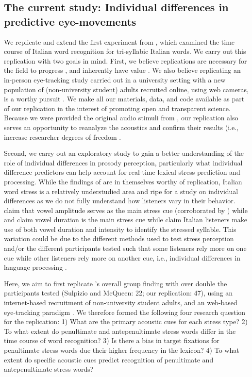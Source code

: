 \subsection{The current study: Individual differences in predictive eye-movements}

We replicate and extend the first experiment from \cite{Sulpizio_McQueen_2012}, which examined the time course of Italian word recognition for tri-syllabic Italian words. We carry out this replication with two goals in mind. First, we believe replications are necessary for the field to progress \citep{Rakosi2017}, and inherently have value \citep{Kobrock2023}. We also believe replicating an in-person eye-tracking study carried out in a university setting with a new population of (non-university student) adults recruited online, using web cameras, is a worthy pursuit \citep{Prystauka_Altmann_Rothman_2023}. We make all our materials, data, and code available as part of our replication in the interest of promoting open and transparent science. Because we were provided the original audio stimuli from \cite{Sulpizio_McQueen_2012}, our replication also serves an opportunity to reanalyze the acoustics and confirm their results (i.e., increase researcher degrees of freedom \cite{Corretta2023}.

Second, we carry out an exploratory study to gain a better understanding of the role of individual differences in prosody perception, particularly what individual difference predictors can help account for real-time lexical stress prediction and processing. While the findings of \cite{Sulpizio_McQueen_2012} are in themselves worthy of replication, Italian word stress is a relatively understudied area and ripe for a study on individual differences as we do not fully understand how listeners vary in their behavior.  \cite{Maturi1998} claim that vowel amplitude serves as the main stress cue (corroborated by \cite{Sulpizio_McQueen_2012}) while \cite{Alfano2006} and \cite{Alfano2009} claim vowel duration is the main stress cue while \cite{Tagliapietra2005} claim Italian listeners make use of both vowel duration and intensity to identify the stressed syllable. This variation could be due to the different methods used to test stress perception and/or the different participants tested such that some listeners rely more on one cue while other listeners rely more on another cue, i.e., individual differences in language processing \citep{Yu2019,Kidd2018}.

Here, we aim to first replicate \cite{Sulpizio_McQueen_2012}'s overall group finding with over double the participants tested (Sulpizio and McQueen: 22; our replication: 47), using an internet-based recruitment of non-university student adults, and an web-based eye-tracking paradigm \citep{Vos_2017}. We therefore formed the following four research question for the replication: 1) What are the primary acoustic cues for each stress type? 2) To what extent do penultimate and antepenultimate stress words differ in the time course of word recognition? 3) Is there a bias in target fixations for penultimate stress words due their higher frequency in the lexicon? 4) To what extent do specific acoustic cues predict recognition of penultimate and antepenultimate stress words? 

